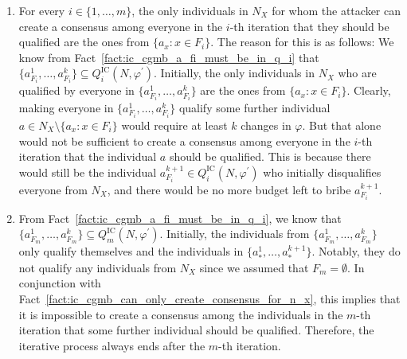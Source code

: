 \documentclass[
    12pt,               %
    a4paper,            %
    bibtotoc,           %
    pointlessnumbers,   %
    ngerman,            %
    titlepage,          %
    leqno,              %
    ]{scrarticle}       %
\newcommand\factref{Fact~\ref}
\begin{document}
\begin{Proof}
\begin{enumerate}[
    topsep=-4pt,
    leftmargin=*,
    itemindent=4.96em,
    label={\textit{Fact \ref*{thm:ic_cgmb_npc}.\arabic*}:},
    ref={\ref*{thm:ic_cgmb_npc}.\arabic*}
]
\item \label{fact:ic_cgmb_can_only_create_consensus_for_n_x}
For every $i \in \{ 1, \ldots, m \}$, the only individuals in $N_X$ for whom the attacker can create a consensus among everyone in the $i$-th iteration that they should be qualified are the ones from $\{ a_x : x \in F_i \}$. The reason for this is as follows: We know from \factref{fact:ic_cgmb_a_fi_must_be_in_q_i} that $\{ a^1_{F_i}, \ldots, a^k_{F_i} \} \subseteq Q^{\text{IC}}_i(N, \varphi^\prime)$. Initially, the only individuals in $N_X$ who are qualified by everyone in $\{ a^1_{F_i}, \ldots, a^k_{F_i} \}$ are the ones from $\{ a_x : x \in F_i \}$. Clearly, making everyone in $\{ a^1_{F_i}, \ldots, a^k_{F_i} \}$ qualify some further individual $a \in N_X \setminus \{ a_x : x \in F_i \}$ would require at least $k$ changes in $\varphi$. But that alone would not be sufficient to create a consensus among everyone in the $i$-th iteration that the individual $a$ should be qualified. This is because there would still be the individual $a^{k+1}_{F_i} \in Q^{\text{IC}}_i(N, \varphi^\prime)$ who initially disqualifies everyone from $N_X$, and there would be no more budget left to bribe $a^{k+1}_{F_i}$.

\item \label{fact:ic_cgmb_chain_ends}
From \factref{fact:ic_cgmb_a_fi_must_be_in_q_i}, we know that $\{ a^1_{F_m}, \ldots, a^k_{F_m} \} \subseteq Q^{\text{IC}}_m(N, \varphi^\prime)$. Initially, the individuals from $\{ a^1_{F_m}, \ldots, a^k_{F_m} \}$ only qualify themselves and the individuals in $\{ a^1_\ast, \ldots, a^{k+1}_\ast \}$. Notably, they do not qualify any individuals from $N_X$ since we assumed that $F_m = \emptyset$. In conjunction with \factref{fact:ic_cgmb_can_only_create_consensus_for_n_x}, this implies that it is impossible to create a consensus among the individuals in the $m$-th iteration that some further individual should be qualified. Therefore, the iterative process always ends after the $m$-th iteration.


\end{enumerate}
\end{Proof}
\end{document}
